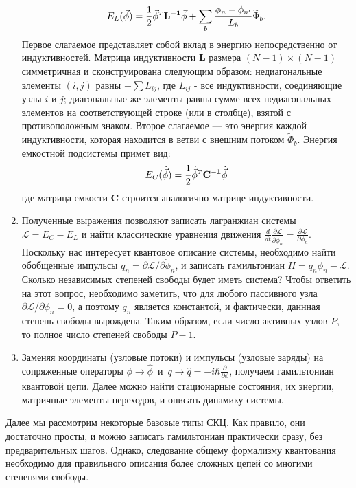 \begin{enumerate}
\begin{equation}
E_L(\vec{\phi}) = \frac{1}{2}{\vec{\phi}^{\mathsmaller T}} \mathbf{L^{-1}}\vec{\phi} + \sum_b \frac{\phi_n-\phi_{n'}}{L_b}\widetilde{\Phi}_b.
\end{equation}
Первое слагаемое представляет собой вклад в энергию непосредственно от индуктивностей. Матрица индуктивности $\mathbf{L}$ размера $(N-1)\!\times\!(N-1)$ симметричная и сконструирована следующим образом: недиагональные элементы $(i,j)$ равны $-\sum L_{ij}$, где $L_{ij}$ - все индуктивности, соединяющие узлы $i$ и $j$; диагональные же элементы равны сумме всех недиагональных элементов на соответствующей строке (или в столбце), взятой с противоположным знаком. Второе слагаемое --- это энергия каждой индуктивности, которая находится в ветви с внешним потоком $\widetilde{\Phi}_b$. Энергия емкостной подсистемы примет вид:
\begin{equation}
E_C(\dot{\vec{\phi}})= \frac{1}{2} {\dot{\vec{\phi}}^{\mathsmaller T}} \mathbf{C^{-1}} \dot{\vec{\phi}}
\end{equation}
где матрица емкости $\mathbf{C}$ строится аналогично матрице индуктивности.
\item Полученные выражения позволяют записать лагранжиан системы $\mathcal{L} = E_C-E_L$ и найти классические уравнения движения $\frac{d}{dt}\frac{\partial\mathcal{L}}{\partial\dot{\phi_n}}=\frac{\partial\mathcal{L}}{\partial{\phi_n}}$. Поскольку нас интересует квантовое описание системы, необходимо найти обобщенные импульсы $q_n = \partial\mathcal{L}/\partial{\dot\phi_n}$,  и записать гамильтониан $H = q_n\phi_n-\mathcal{L}$. Сколько независимых степеней свободы будет иметь система? Чтобы ответить на этот вопрос, необходимо заметить, что для любого пассивного узла $\partial \mathcal{L}/\partial{\phi_n}=0$, а поэтому $q_n$ является константой, и фактически, даннная степень свободы вырождена. Таким образом, если число активных узлов $P$, то полное число степеней свободы $P-1$.
\item Заменяя координаты (узловые потоки) и импульсы (узловые заряды) на сопряженные операторы $\phi\rightarrow\hat{\phi}$~и~$q\rightarrow\hat{q} = -i\hbar\frac{\partial}{\partial \phi}$, получаем гамильтониан квантовой цепи. Далее можно найти стационарные состояния, их энергии, матричные элементы переходов, и описать динамику системы.
\end{enumerate}
Далее мы рассмотрим некоторые базовые типы СКЦ. Как правило, они достаточно просты, и можно записать гамильтониан практически сразу, без предварительных шагов. Однако, следование общему формализму квантования необходимо для правильного описания более сложных цепей со многими степенями свободы. 
   
